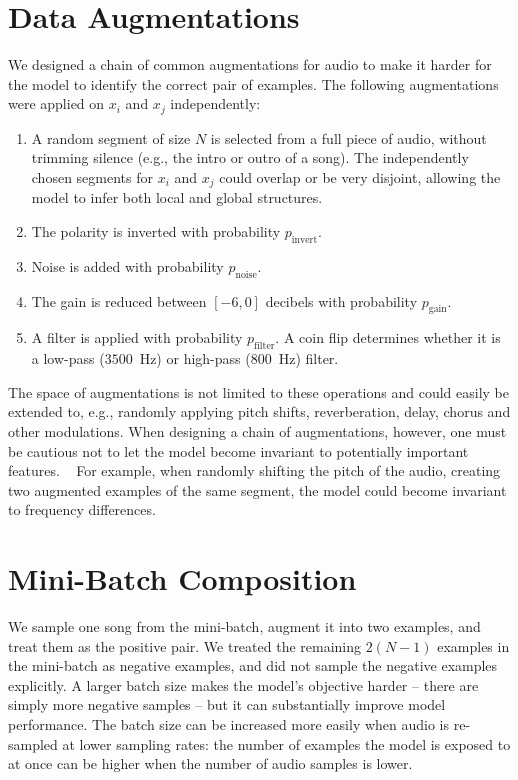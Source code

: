 \documentclass{report}
\DeclareRobustCommand{\diffword}[1]{{\sethlcolor{orange}\hl{#1}}}
\begin{document}
\section{Data Augmentations}
We designed a chain of common augmentations for audio to make it harder for the model to identify the correct pair of examples. The following augmentations were applied on ${x_i}$ and ${x_j}$ independently:
\begin{enumerate}
    \item A random segment of size $N$ is selected from a full piece of audio, without trimming silence (e.g., the intro or outro of a song). The independently chosen segments for $x_i$ and $x_j$ could overlap or be very disjoint, allowing the model to infer both local and global structures.
    \item The polarity is inverted with probability $p_{\mathrm{invert}}$.
    \item Noise is added with probability $p_{\mathrm{noise}}$.
    \item The gain is reduced between $[-6, 0]$ decibels with probability $p_{\mathrm{gain}}$.
    \item A filter is applied with probability $p_{\mathrm{filter}}$. A coin flip determines whether it is a low-pass ($3500$~Hz) or high-pass ($800$~Hz) filter.
\end{enumerate}
The space of augmentations is not limited to these operations and could easily be extended to, e.g., randomly applying pitch shifts, reverberation, delay, chorus and other modulations. When designing a chain of augmentations, however, one must be cautious not to let the model become invariant to potentially important features. \
For example, when randomly shifting the pitch of the audio, creating two augmented examples of the same segment, 
the model could become invariant to frequency differences.


\section{Mini-Batch Composition} %
We sample one song from the mini-batch, augment it into two examples, and treat them as the positive pair. We treated the remaining $2(N-1)$ examples in the mini-batch as negative examples, and did not sample the negative examples explicitly. A larger batch size makes the model's objective harder -- there are simply more negative samples -- but it can substantially improve model performance\cite{chen_simple_2020}. The batch size can be increased more easily when audio is re-sampled at lower sampling rates: the number of examples the model is exposed to at once can be higher when the number of audio samples is lower.
\end{document}
